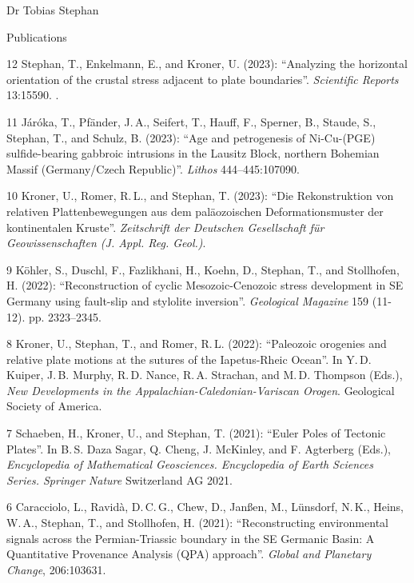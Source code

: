 \documentclass[10pt, paper=letter]{scrartcl} %
\begin{document}
\begin{cv}{Dr Tobias Stephan}
\begin{cvlist}{Publications}
     \item[12] Stephan, T., Enkelmann, E., and Kroner, U. (2023): \enquote{Analyzing the horizontal orientation of the crustal stress adjacent to plate boundaries}. \textit{Scientific Reports} 13:15590. . 
    \item[11] Járóka, T.,  Pfänder, J.\,A., Seifert, T., Hauff, F., Sperner, B., Staude, S., Stephan, T., and Schulz, B. (2023): \enquote{Age and petrogenesis of Ni-Cu-(PGE) sulfide-bearing gabbroic intrusions in the Lausitz Block, northern Bohemian Massif (Germany/Czech Republic)}.  \textit{Lithos} 444--445:107090. 
    \item[10] Kroner, U., Romer, R.\,L., and Stephan, T. (2023): \enquote{Die Rekonstruktion von relativen Plattenbewegungen aus dem paläozoischen Deformationsmuster der kontinentalen Kruste}. \textit{Zeitschrift der Deutschen Gesellschaft für Geowissenschaften (J. Appl. Reg. Geol.)}. 
    \item[9] K\"ohler, S., Duschl, F., Fazlikhani, H., Koehn, D., Stephan, T., and Stollhofen, H. (2022): \enquote{Reconstruction of cyclic Mesozoic-Cenozoic stress development in SE Germany using fault-slip and stylolite inversion}. \textit{Geological Magazine} 159 (11-12). pp. 2323--2345.\newline
    \item[8] Kroner, U., Stephan, T., and Romer, R.\,L. (2022): \enquote{Paleozoic orogenies and relative plate motions at the sutures of the Iapetus-Rheic Ocean}. In Y.\,D. Kuiper, J.\,B. Murphy, R.\,D. Nance, R.\,A. Strachan, and M.\,D. Thompson (Eds.), \textit{New Developments in the Appalachian-Caledonian-Variscan Orogen}. Geological Society of America. 
    \item[7] Schaeben, H., Kroner, U., and Stephan, T. (2021): \enquote{Euler Poles of Tectonic Plates}. In B.\,S. Daza Sagar, Q. Cheng, J. McKinley, and F. Agterberg (Eds.), \textit{Encyclopedia of Mathematical Geosciences. Encyclopedia of Earth Sciences Series. Springer Nature} Switzerland AG 2021.  
    \item[6] Caracciolo, L., Ravid\`a, D.\,C.\,G., Chew, D., Jan{\ss}en, M., L\"unsdorf, N.\,K., Heins, W.\,A., Stephan, T., and Stollhofen, H. (2021): \enquote{Reconstructing environmental signals across the Permian-Triassic boundary in the SE Germanic Basin: A Quantitative Provenance Analysis (QPA) approach}. \textit{Global and Planetary Change}, 206:103631.  

\end{cvlist}
\end{cv}
\end{document}
